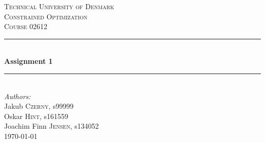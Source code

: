 \begin{titlepage}

\newcommand{\HRule}{\rule{\linewidth}{0.5mm}} %

\center %
 

\textsc{\LARGE Technical University of Denmark}\\[1.5cm] %
\textsc{\Large Constrained Optimization}\\[0.5cm] %
\textsc{\large Course 02612}\\[0.5cm] %


\HRule \\[0.4cm]
{ \huge \bfseries Assignment 1}\\[0.4cm] %
\HRule \\[1.5cm]
 
\Large \emph{Authors:}\\
Jakub \textsc{Czerny}, s99999\\[10pt]
Oskar \textsc{Hint}, s161559\\[10pt]
Joachim Finn \textsc{Jensen}, s134052\\[10pt]




{\large \today }\\[2cm] %


\end{titlepage}
